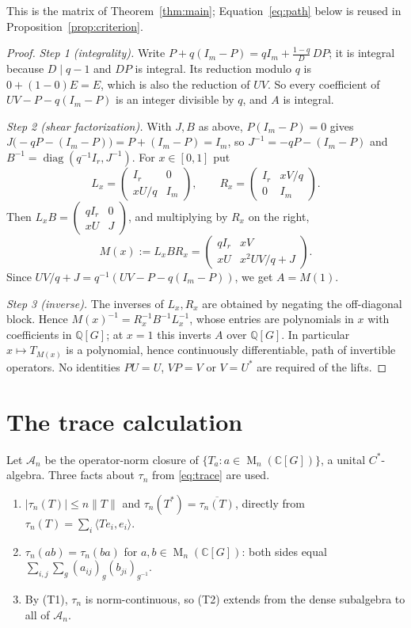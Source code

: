 \documentclass[11pt]{article}
\theoremstyle{remark}
\numberwithin{equation}{section}
\newcommand{\Q}{\mathbb Q}
\newcommand{\C}{\mathbb C}
\newcommand{\Mat}{\operatorname{M}}
\newcommand{\diag}{\operatorname{diag}}
\begin{document}
This is the matrix of Theorem~\ref{thm:main}; Equation~\eqref{eq:path} below is reused in Proposition~\ref{prop:criterion}.

\begin{proof}
\emph{Step 1 (integrality).} Write $P+q(I_m-P)=qI_m+\frac{1-q}{D}\,DP$; it is integral because $D\mid q-1$ and $DP$ is integral. Its reduction modulo $q$ is $0+(1-0)E=E$, which is also the reduction of $UV$. So every coefficient of $UV-P-q(I_m-P)$ is an integer divisible by $q$, and $A$ is integral.

\emph{Step 2 (shear factorization).} With $J,B$ as above, $P(I_m-P)=0$ gives $J\bigl(-qP-(I_m-P)\bigr)=P+(I_m-P)=I_m$, so $J^{-1}=-qP-(I_m-P)$ and $B^{-1}=\diag(q^{-1}I_r,J^{-1})$. For $x\in[0,1]$ put
\[
 L_x=\begin{pmatrix}I_r&0\\xU/q&I_m\end{pmatrix},\qquad
 R_x=\begin{pmatrix}I_r&xV/q\\0&I_m\end{pmatrix}.
\]
Then $L_xB=\begin{pmatrix}qI_r&0\\xU&J\end{pmatrix}$, and multiplying by $R_x$ on the right,
\begin{equation}\label{eq:path}
 M(x):=L_xBR_x=
 \begin{pmatrix}qI_r&xV\\xU&x^2UV/q+J\end{pmatrix}.
\end{equation}
Since $UV/q+J=q^{-1}(UV-P-q(I_m-P))$, we get $A=M(1)$.

\emph{Step 3 (inverse).} The inverses of $L_x,R_x$ are obtained by negating the off-diagonal block. Hence $M(x)^{-1}=R_x^{-1}B^{-1}L_x^{-1}$, whose entries are polynomials in $x$ with coefficients in $\Q[G]$; at $x=1$ this inverts $A$ over $\Q[G]$. In particular $x\mapsto T_{M(x)}$ is a polynomial, hence continuously differentiable, path of invertible operators. No identities $PU=U$, $VP=V$ or $V=U^*$ are required of the lifts.
\end{proof}

\section{The trace calculation}
\label{sec:analysis}

Let $\mathcal A_n$ be the operator-norm closure of $\{T_a:a\in\Mat_n(\C[G])\}$, a unital $C^*$-algebra. Three facts about $\tau_n$ from \eqref{eq:trace} are used.
\begin{enumerate}[label=(T\arabic*),itemsep=1pt,topsep=3pt]
\item $|\tau_n(T)|\le n\|T\|$ and $\tau_n(T^*)=\overline{\tau_n(T)}$, directly from $\tau_n(T)=\sum_i\langle Te_i,e_i\rangle$.
\item $\tau_n(ab)=\tau_n(ba)$ for $a,b\in\Mat_n(\C[G])$: both sides equal $\sum_{i,j}\sum_g(a_{ij})_g(b_{ji})_{g^{-1}}$.
\item By (T1), $\tau_n$ is norm-continuous, so (T2) extends from the dense subalgebra to all of $\mathcal A_n$.
\end{enumerate}
\end{document}

